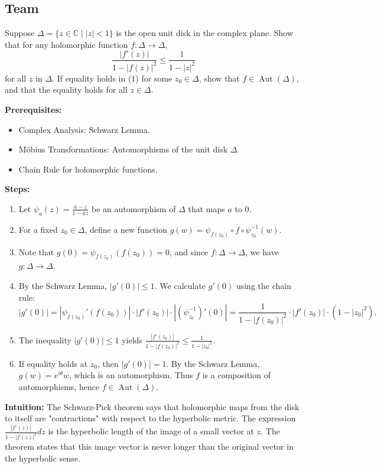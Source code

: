 \subsection{Team}

\begin{exercise}
\label{analysis:2013:7}
Suppose $\Delta = \{z \in \mathbb{C} \mid |z| < 1\}$ is the open unit disk in the complex plane. Show that for any holomorphic function $f: \Delta \to \Delta$,
\[
\frac{|f'(z)|}{1 - |f(z)|^2} \leq \frac{1}{1 - |z|^2} \tag{1}
\]
for all $z$ in $\Delta$. If equality holds in (1) for some $z_0 \in \Delta$, show that $f \in \operatorname{Aut}(\Delta)$, and that the equality holds for all $z \in \Delta$.
\end{exercise}

\begin{solution}
\textbf{Prerequisites:}
\begin{itemize}
    \item Complex Analysis: Schwarz Lemma.
    \item Möbius Transformations: Automorphisms of the unit disk $\Delta$.
    \item Chain Rule for holomorphic functions.
\end{itemize}

\textbf{Steps:}
\begin{enumerate}
    \item Let $\psi_a(z) = \frac{a-z}{1-\bar{a}z}$ be an automorphism of $\Delta$ that maps $a$ to $0$.

    \item For a fixed $z_0 \in \Delta$, define a new function $g(w) = \psi_{f(z_0)} \circ f \circ \psi_{z_0}^{-1}(w)$.

    \item Note that $g(0) = \psi_{f(z_0)}(f(z_0)) = 0$, and since $f: \Delta \to \Delta$, we have $g: \Delta \to \Delta$.

    \item By the Schwarz Lemma, $|g'(0)| \leq 1$. We calculate $g'(0)$ using the chain rule:
    \[
    |g'(0)| = |\psi_{f(z_0)}'(f(z_0))| \cdot |f'(z_0)| \cdot |(\psi_{z_0}^{-1})'(0)| = \frac{1}{1-|f(z_0)|^2} \cdot |f'(z_0)| \cdot (1-|z_0|^2).
    \]

    \item The inequality $|g'(0)| \leq 1$ yields $\frac{|f'(z_0)|}{1-|f(z_0)|^2} \leq \frac{1}{1-|z_0|^2}$.

    \item If equality holds at $z_0$, then $|g'(0)| = 1$. By the Schwarz Lemma, $g(w) = e^{i\theta}w$, which is an automorphism. Thus $f$ is a composition of automorphisms, hence $f \in \operatorname{Aut}(\Delta)$.
\end{enumerate}

\textbf{Intuition:}
The Schwarz-Pick theorem says that holomorphic maps from the disk to itself are "contractions" with respect to the hyperbolic metric. The expression $\frac{|f'(z)|}{1-|f(z)|^2} dz$ is the hyperbolic length of the image of a small vector at $z$. The theorem states that this image vector is never longer than the original vector in the hyperbolic sense.
\end{solution}

